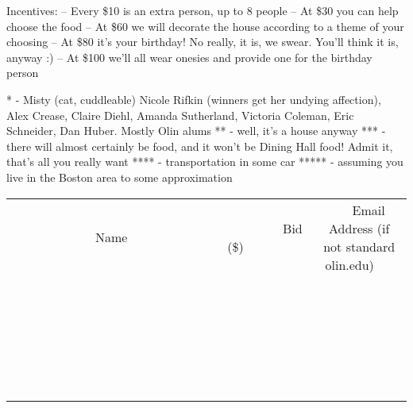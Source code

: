 \documentclass[11pt]{article}
\begin{document}
Incentives:
-- Every \$10 is an extra person, up to 8 people
-- At \$30 you can help choose the food
-- At \$60 we will decorate the house according to a theme of your choosing
-- At \$80 it's your birthday! No really, it is, we swear. You'll think it is, anyway :)
-- At \$100 we'll all wear onesies and provide one for the birthday person

* - Misty (cat, cuddleable) Nicole Rifkin (winners get her undying affection), Alex Crease, Claire Diehl, Amanda Sutherland, Victoria Coleman, Eric Schneider, Dan Huber. Mostly Olin alums
** - well, it's a house anyway
*** - there will almost certainly be food, and it won't be Dining Hall food! Admit it, that's all you really want
**** - transportation in some car
***** - assuming you live in the Boston area to some approximation
\\[6ex]
\begin{tabular}{c c c}
~~~~~~~~~~~~~Name~~~~~~~~~~~~~ & ~~~~~~~~~Bid (\$)~~~~~~~~~  & ~~~Email Address (if not standard olin.edu)~~~\\
 & & \\
\hline
 & & \\
\hline
 & & \\
\hline
 & & \\
\hline
 & & \\
\hline
 & & \\
\hline
 & & \\
\hline
 & & \\
\hline
 & & \\
\hline
 & & \\
\hline
 & & \\
\hline
 & & \\
\hline
 & & \\
\hline
 & & \\
\hline
 & & \\
\hline
 & & \\
\hline
 & & \\
\hline
 & & \\
\hline
 & & \\
\hline
 & & \\
\hline
 & & \\
\hline
 & & \\
\hline
 & & \\
\hline
 & & \\
\hline
 & & \\
\hline
 & & \\
\hline
\end{tabular}
\newpage
\end{document}
